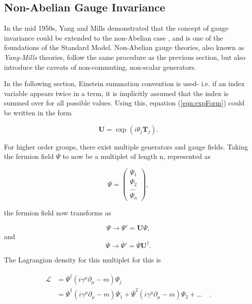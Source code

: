 \documentclass{article}
\begin{document}
\subsection{Non-Abelian Gauge Invariance}%
\label{sec:SM_naGI}
In the mid 1950s, Yang and Mills demonstrated that the concept of gauge invariance could be extended to the non-Abelian case \cite{YangMillsTheory}, and is one of the foundations of the Standard Model. Non-Abelian gauge theories, also known as \textit{Yang-Mills} theories, follow the same procedure as the previous section, but also introduce the caveats of non-commuting, non-scalar generators.

In the following section, Einstein summation convention is used- i.e. if an index variable appears twice in a term, it is implicitly assumed that the index is summed over for all possible values. Using this, equation (\ref{eqn:expForm}) could be written in the form

\begin{equation}
\bm{U} = \exp(i\theta_j \bm{T}_j).
\end{equation}

For higher order groups, there exist multiple generators and gauge fields. Taking the fermion field $\Psi$ to now be a multiplet of length n, represented as

\begin{equation}
\label{matrix:femionMultiplet}
\Psi = 
\left(
\begin{matrix}
    \Psi_1  \\
    \Psi_2  \\
    ...     \\
    \Psi_n
\end{matrix}
\right),
\end{equation}

the fermion field now transforms as 

\begin{equation}
\label{eqn:nonAbelianFermionFieldTransformation}
\Psi\rightarrow\Psi'=\bm{U}\Psi,
\end{equation}
and 
\begin{equation}
\overline{\Psi}\rightarrow\overline{\Psi}' = \overline{\Psi}\bm{U}^\dagger.
\end{equation}

The Lagrangian density for this multiplet for this is 

\begin{equation}
\begin{split}
\mathcal{L} & = \overline{\Psi}^j(i \gamma^\mu \partial_\mu -m )\Psi_j \\
& = \overline{\Psi}^1 (i \gamma^\mu \partial_\mu - m)\Psi_1 + \overline{\Psi}^2 (i \gamma^\mu \partial_\mu - m)\Psi_2 + ...\,\,\,\,\,\,.
\end{split}
\end{equation}
\end{document}
